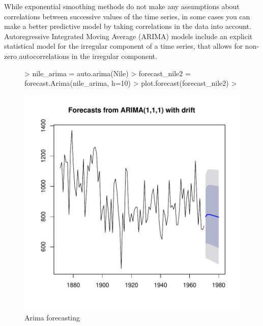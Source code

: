 \documentclass[11pt, a4paper]{article} %
\begin{document}
\noindent While exponential smoothing methods do not make any assumptions about correlations between successive values of the time series, in some cases you can make a better predictive model by taking correlations in the data into account. Autoregressive Integrated Moving Average (ARIMA) models include an explicit statistical model for the irregular component of a time series, that allows for non-zero autocorrelations in the irregular component.
\begin{figure}
\centering
\begin{Schunk}
\begin{Sinput}
> nile_arima = auto.arima(Nile)
> forecast_nile2 = forecast.Arima(nile_arima, h=10)
> plot.forecast(forecast_nile2)
> 
\end{Sinput}
\end{Schunk}
\includegraphics{alles-044}
\caption{Arima forecasting}
\end{figure}
\end{document}
